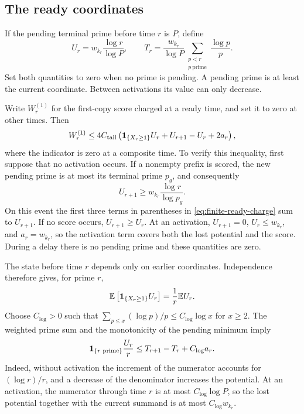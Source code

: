 \subsection{The ready coordinates}

If the pending terminal prime before time \(r\) is \(P\), define
\[
 U_r=w_{k_r}\frac{\log r}{\log P},\qquad
 T_r=\frac{w_{k_r}}{\log P}
           \sum_{\substack{p<r\\p\ \mathrm{prime}}}\frac{\log p}{p}.
\]
Set both quantities to zero when no prime is pending. A pending prime
is at least the current coordinate. Between activations its value can
only decrease.

Write \(W_r^{(1)}\) for the first-copy score charged at a ready time,
and set it to zero at other times. Then
\begin{equation}\label{eq:finite-ready-charge}
 W_r^{(1)}\le 4C_{\rm tail}
 \left(\mathbf 1_{\{X_r\ge1\}}U_r+U_{r+1}-U_r+2a_r\right),
\end{equation}
where the indicator is zero at a composite time. To verify this
inequality, first suppose that no activation occurs. If a nonempty
prefix is scored, the new pending prime is at most its terminal prime
\(p_g\), and consequently
\[
 U_{r+1}\ge w_{k_r}\frac{\log r}{\log p_g}.
\]
On this event the first three terms in parentheses in
\eqref{eq:finite-ready-charge} sum to \(U_{r+1}\). If no score occurs,
\(U_{r+1}\ge U_r\). At an activation, \(U_{r+1}=0\),
\(U_r\le w_{k_r}\), and \(a_r=w_{k_r}\), so the activation term
covers both the lost potential and the score. During a delay there is
no pending prime and these quantities are zero.

The state before time \(r\) depends only on earlier coordinates.
Independence therefore gives, for prime \(r\),
\[
 \mathbb E\left[\mathbf 1_{\{X_r\ge1\}}U_r\right]=\frac1r\mathbb E U_r.
\]
Choose \(C_{\log}>0\) such that
\(\sum_{p\le x}(\log p)/p\le C_{\log}\log x\) for \(x\ge2\).
The weighted prime sum and the monotonicity of the pending minimum
imply
\begin{equation}\label{eq:finite-prime-potential}
 \mathbf 1_{\{r\text{ prime}\}}\frac{U_r}{r}
 \le T_{r+1}-T_r+C_{\log}a_r.
\end{equation}
Indeed, without activation the increment of the numerator accounts
for \((\log r)/r\), and a decrease of the denominator increases the
potential. At an activation, the numerator through time \(r\) is at
most \(C_{\log}\log P\), so the lost potential together with the
current summand is at most \(C_{\log}w_{k_r}\).

